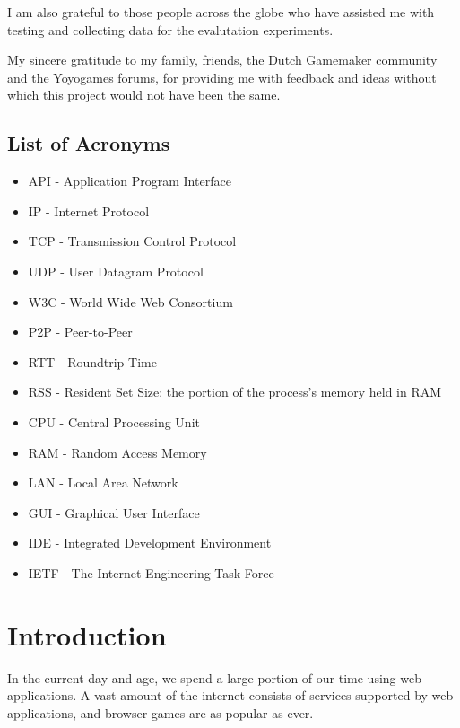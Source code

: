 \documentclass[bsc,frontabs,twoside,singlespacing,parskip,deptreport]{infthesis}     %
\begin{document}
I am also grateful to those people across the globe who have assisted me with testing and collecting data for the evalutation experiments.

My sincere gratitude to my family, friends, the Dutch Gamemaker community and the Yoyogames forums, for providing me with feedback and ideas without which this project would not have been the same.

\section*{List of Acronyms}
\begin{itemize}
\item API - Application Program Interface
\item IP - Internet Protocol
\item TCP - Transmission Control Protocol
\item UDP - User Datagram Protocol
\item W3C - World Wide Web Consortium
\item P2P - Peer-to-Peer
\item RTT - Roundtrip Time
\item RSS - Resident Set Size: the portion of the process's memory held in RAM
\item CPU - Central Processing Unit
\item RAM - Random Access Memory
\item LAN - Local Area Network
\item GUI - Graphical User Interface
\item IDE - Integrated Development Environment
\item IETF - The Internet Engineering Task Force
\end{itemize}

\tableofcontents




\chapter{Introduction}
In the current day and age, we spend a large portion of our time using web applications. A vast amount of the internet consists of services supported by web applications, and browser games are as popular as ever.
\end{document}

